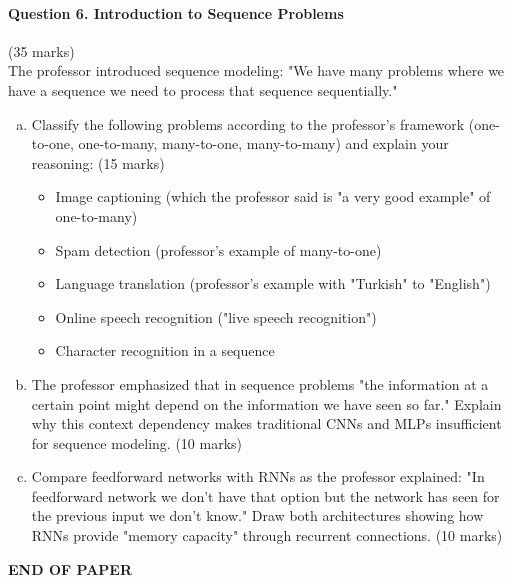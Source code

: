 \documentclass[12pt]{article}
\newcommand{\mediumanswer}{\vspace{3cm}}
\newcommand{\journalspace}{\vspace{4.5cm}}
\begin{document}
\newpage
\paragraph{Question 6. Introduction to Sequence Problems}{\hfill (35 marks)}\\
The professor introduced sequence modeling: "We have many problems where we have a sequence we need to process that sequence sequentially."

\begin{enumerate}[(a)]
    \item Classify the following problems according to the professor's framework (one-to-one, one-to-many, many-to-one, many-to-many) and explain your reasoning: \hfill (15 marks)
    \begin{itemize}
        \item Image captioning (which the professor said is "a very good example" of one-to-many)
        \item Spam detection (professor's example of many-to-one)
        \item Language translation (professor's example with "Turkish" to "English")
        \item Online speech recognition ("live speech recognition")
        \item Character recognition in a sequence
    \end{itemize}
    
    \journalspace
    
    \item The professor emphasized that in sequence problems "the information at a certain point might depend on the information we have seen so far." Explain why this context dependency makes traditional CNNs and MLPs insufficient for sequence modeling. \hfill (10 marks)
    
    \mediumanswer
    
    \item Compare feedforward networks with RNNs as the professor explained: "In feedforward network we don't have that option but the network has seen for the previous input we don't know." Draw both architectures showing how RNNs provide "memory capacity" through recurrent connections. \hfill (10 marks)
    
    \begin{center}
    \end{center}
\end{enumerate}

\vfill
\begin{center}{\bf END OF PAPER}\end{center}
\end{document}
